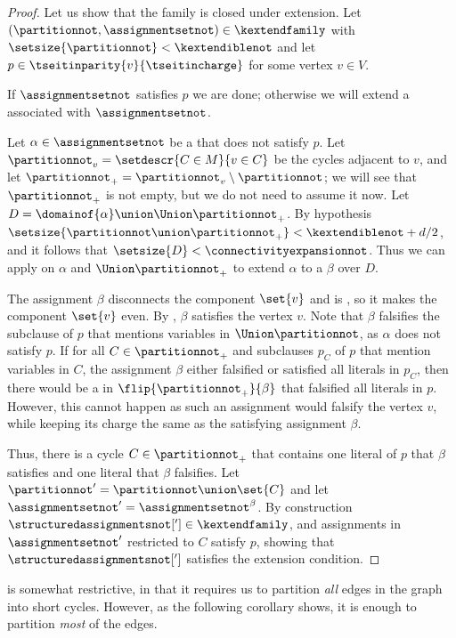 \begin{proof}
  Let us show that the family is closed under extension. Let $(\partitionnot,\assignmentsetnot)\in\kextendfamily$ with $\setsize{\partitionnot} < \kextendiblenot$ and let $p\in\tseitinparity{v}{\tseitincharge}$ for some vertex $v\in V$.

  If $\assignmentsetnot$ satisfies $p$ we are done; otherwise we will extend a \nonsplittingassignment associated with $\assignmentsetnot$.

  Let $\alpha\in\assignmentsetnot$ be a \nonsplittingassignment that does not satisfy $p$. Let $\partitionnot_v=\setdescr{C\in M}{v\in C}$ be the cycles adjacent to $v$, and let $\partitionnot_+=\partitionnot_v\setminus\partitionnot$; we will see that $\partitionnot_+$ is not empty, but we do not need to assume it now. Let $D=\domainof{\alpha}\union\Union\partitionnot_+$. By hypothesis $\setsize{\partitionnot\union\partitionnot_+} < \kextendiblenot + d/2$, and it follows that $\setsize{D} < \connectivityexpansionnot$. Thus we can apply  on $\alpha$ and $\Union\partitionnot_+$ to extend $\alpha$ to a \nonsplittingassignment $\beta$ over $D$.

The assignment $\beta$ disconnects the component $\set{v}$ and is \nonsplitting, so it makes the component $\set{v}$ even. By , $\beta$ satisfies the vertex $v$. Note that $\beta$ falsifies the subclause of $p$ that mentions variables in $\Union\partitionnot$, as $\alpha$ does not satisfy $p$. If for all $C\in\partitionnot_+$ and subclauses $p_C$ of $p$ that mention variables in $C$, the assignment $\beta$ either falsified or satisfied all literals in $p_C$, then there would be a \nonsplittingassignment in $\flip{\partitionnot_+}{\beta}$ that falsified all literals in $p$. However, this cannot happen as such an assignment would falsify the vertex $v$, while keeping its charge the same as the satisfying assignment $\beta$.

Thus, there is a cycle $C\in\partitionnot_+$ that contains one literal of $p$ that $\beta$ satisfies and one literal that $\beta$ falsifies. Let $\partitionnot'=\partitionnot\union\set{C}$ and let $\assignmentsetnot'=\assignmentsetnot^\beta$. By construction $\structuredassignmentsnot['] \in \kextendfamily$, and assignments in $\assignmentsetnot'$ restricted to $C$ satisfy $p$, showing that $\structuredassignmentsnot[']$ satisfies the extension condition.
\end{proof}

 is somewhat restrictive, in that it requires us to partition \emph{all} edges in the graph into short cycles. However, as the following corollary shows, it is enough to partition \emph{most} of the edges.

